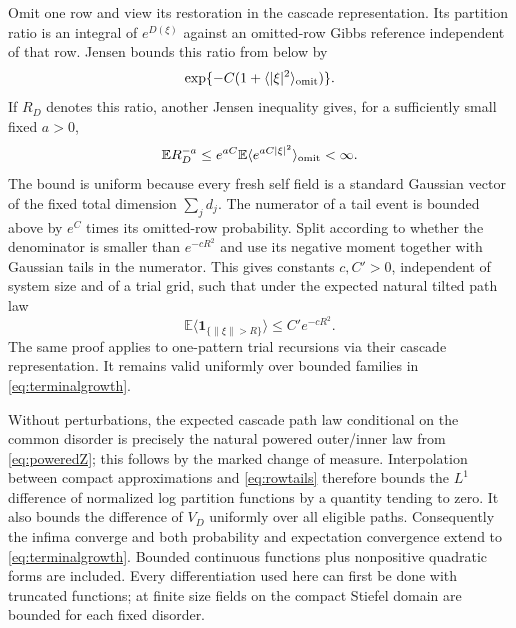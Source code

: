 \documentclass[11pt]{article}
\numberwithin{equation}{section}
\theoremstyle{definition}
\newcommand{\E}{\mathbb E}
\newcommand{\norm}[1]{\lVert #1\rVert}
\newcommand{\one}{\mathbf 1}
\begin{document}
Omit one row and view its restoration in the cascade representation. Its partition ratio is an integral of $e^{D(\xi)}$ against an omitted-row Gibbs reference independent of that row. Jensen bounds this ratio from below by
\[
\exp\{-C(1+\langle|\xi|^2\rangle_{\rm omit})\}.
\]
If $R_D$ denotes this ratio, another Jensen inequality gives, for a sufficiently small fixed $a>0$,
\[
\E R_D^{-a}\le e^{aC}\E\langle e^{aC|\xi|^2}\rangle_{\rm omit}<\infty.
\]
The bound is uniform because every fresh self field is a standard Gaussian vector of the fixed total dimension $\sum_jd_j$. The numerator of a tail event is bounded above by $e^C$ times its omitted-row probability. Split according to whether the denominator is smaller than $e^{-cR^2}$ and use its negative moment together with Gaussian tails in the numerator. This gives constants $c,C'>0$, independent of system size and of a trial grid, such that under the expected natural tilted path law
\begin{equation}\label{eq:rowtails}
\E\langle\one_{\{\norm\xi>R\}}\rangle\le C'e^{-cR^2}.
\end{equation}
The same proof applies to one-pattern trial recursions via their cascade representation. It remains valid uniformly over bounded families in \eqref{eq:terminalgrowth}.

Without perturbations, the expected cascade path law conditional on the common disorder is precisely the natural powered outer/inner law from \eqref{eq:poweredZ}; this follows by the marked change of measure. Interpolation between compact approximations and \eqref{eq:rowtails} therefore bounds the $L^1$ difference of normalized log partition functions by a quantity tending to zero. It also bounds the difference of $V_D$ uniformly over all eligible paths. Consequently the infima converge and both probability and expectation convergence extend to \eqref{eq:terminalgrowth}. Bounded continuous functions plus nonpositive quadratic forms are included. Every differentiation used here can first be done with truncated functions; at finite size fields on the compact Stiefel domain are bounded for each fixed disorder.
\end{document}
